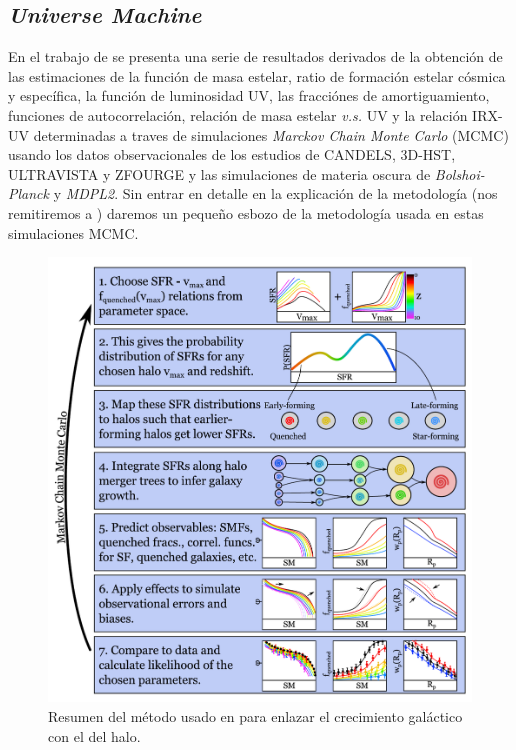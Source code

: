 \subsection{\textit{Universe Machine}}

En el trabajo de \cite{behroozi2019universemachine} se presenta una serie de resultados derivados de la obtención de las estimaciones de la función de masa estelar, ratio de formación estelar cósmica y específica, la función de luminosidad UV, las fracciónes de amortiguamiento, funciones de autocorrelación, relación de masa estelar \textit{v.s.} UV y la relación IRX-UV determinadas a traves de simulaciones \textit{Marckov Chain Monte Carlo} (MCMC) usando los datos observacionales de los estudios de CANDELS, 3D-HST, ULTRAVISTA y ZFOURGE y las simulaciones de materia oscura de \textit{Bolshoi-Planck} y \textit{MDPL2}. Sin entrar en detalle en la explicación de la metodología (nos remitiremos a \cite{behroozi2019universemachine}) daremos un pequeño esbozo de la metodología usada en estas simulaciones MCMC.\\

\begin{figure}
	\centering
	\includegraphics[scale=0.5]{Figures/behroozi_mcmc}
	\caption{\label{fig:behroozi_mcmc} Resumen del método usado en \cite{behroozi2019universemachine} para enlazar el crecimiento galáctico con el del halo.}
\end{figure}

